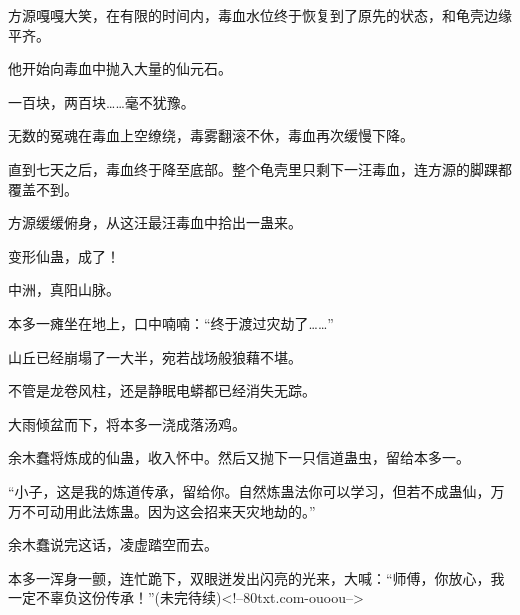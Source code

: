 \begin{this_body}
方源嘎嘎大笑，在有限的时间内，毒血水位终于恢复到了原先的状态，和龟壳边缘平齐。

他开始向毒血中抛入大量的仙元石。

一百块，两百块……毫不犹豫。

无数的冤魂在毒血上空缭绕，毒雾翻滚不休，毒血再次缓慢下降。

直到七天之后，毒血终于降至底部。整个龟壳里只剩下一汪毒血，连方源的脚踝都覆盖不到。

方源缓缓俯身，从这汪最汪毒血中拾出一蛊来。

变形仙蛊，成了！

中洲，真阳山脉。

本多一瘫坐在地上，口中喃喃：“终于渡过灾劫了……”

山丘已经崩塌了一大半，宛若战场般狼藉不堪。

不管是龙卷风柱，还是静眠电蟒都已经消失无踪。

大雨倾盆而下，将本多一浇成落汤鸡。

余木蠢将炼成的仙蛊，收入怀中。然后又抛下一只信道蛊虫，留给本多一。

“小子，这是我的炼道传承，留给你。自然炼蛊法你可以学习，但若不成蛊仙，万万不可动用此法炼蛊。因为这会招来天灾地劫的。”

余木蠢说完这话，凌虚踏空而去。

本多一浑身一颤，连忙跪下，双眼迸发出闪亮的光来，大喊：“师傅，你放心，我一定不辜负这份传承！”(未完待续)<!--80txt.com-ouoou-->

\end{this_body}

